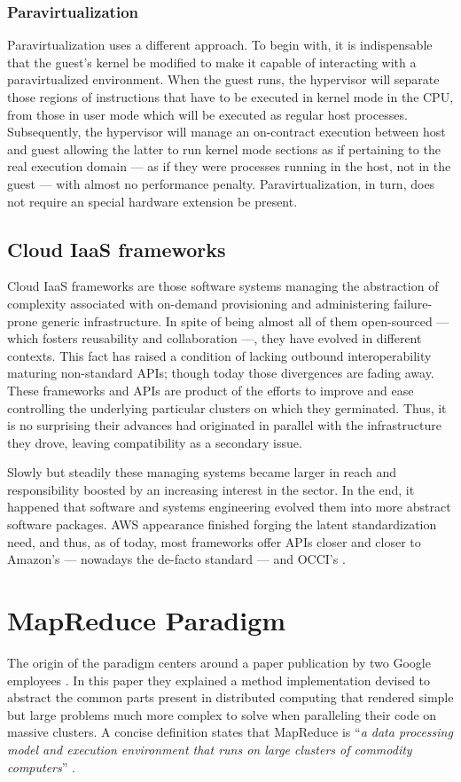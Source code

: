 \subsubsection{Paravirtualization}\label{subsubsec:paravirt}
\noindent Paravirtualization uses a different approach. To begin with, it is indispensable that the guest's kernel be modified to make it capable of interacting with a paravirtualized environment. When the guest runs, the hypervisor will separate those regions of instructions that have to be executed in kernel mode in the CPU, from those in user mode which will be executed as regular host processes. Subsequently, the hypervisor will manage an on-contract execution between host and guest allowing the latter to run kernel mode sections as if pertaining to the real execution domain --- as if they were processes running in the host, not in the guest --- with almost no performance penalty. Paravirtualization, in turn, does not require an special hardware extension be present.

\subsection{Cloud IaaS frameworks}\label{subsec:frameworksiaas}
\noindent Cloud IaaS frameworks are those software systems managing the abstraction of complexity associated with on-demand provisioning and administering failure-prone generic infrastructure. In spite of being almost all of them open-sourced --- which fosters reusability and collaboration ---, they have evolved in different contexts. This fact has raised a condition of lacking outbound interoperability maturing non-standard APIs; though today those divergences are fading away. These frameworks and APIs are product of the efforts to improve and ease controlling the underlying particular clusters on which they germinated. Thus, it is no surprising their advances had originated in parallel with the infrastructure they drove, leaving compatibility as a secondary issue.

Slowly but steadily these managing systems became larger in reach and responsibility boosted by an increasing interest in the sector. In the end, it happened that software and systems engineering evolved them into more abstract software packages. AWS appearance finished forging the latent standardization need, and thus, as of today, most frameworks offer APIs closer and closer to Amazon's --- nowadays the de-facto standard --- and OCCI's \cite{occisdraft}.

\section{MapReduce Paradigm}\label{sec:mapred}
\noindent The origin of the paradigm centers around a paper publication by two Google employees \cite{googlemapreduce}. In this paper they explained a method implementation devised to abstract the common parts present in distributed computing that rendered simple but large problems much more complex to solve when paralleling their code on massive clusters. A concise definition states that MapReduce is ``\textit{a data processing model and execution environment that runs on large clusters of commodity computers}'' \cite{hadoopdefguide}.

